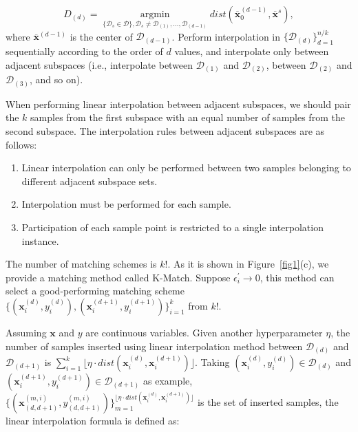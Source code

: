 \documentclass[sn-mathphys,Numbered]{sn-jnl}%
\theoremstyle{thmstyleone}%
\theoremstyle{thmstyletwo}%
\theoremstyle{thmstylethree}%
\begin{document}
\begin{equation}
D_{(d)}=\mathop{argmin}\limits_{\{\mathcal{D}_s\in\mathcal{D}\},\mathcal{D}_s\neq\mathcal{D}_{(1)},\ldots,\mathcal{D}_{(d-1)}}dist(\overline{\boldsymbol{x}}_0^{(d-1)},\overline{\boldsymbol{x}}^s),\label{eq6}
\end{equation}
where $\overline{\boldsymbol{x}}^{(d-1)}$ is the center of $\mathcal{D}_{(d-1)}$. Perform interpolation in $\{\mathcal{D}_{(d)}\}_{d=1}^{n/k}$ sequentially according to the order of $d$ values, and interpolate only between adjacent subspaces (i.e., interpolate between $\mathcal{D}_{(1)}$ and $\mathcal{D}_{(2)}$, between $\mathcal{D}_{(2)}$ and $\mathcal{D}_{(3)}$, and so on). 

When performing linear interpolation between adjacent subspaces, we should pair the $k$ samples from the first subspace with an equal number of samples from the second subspace. The interpolation rules between adjacent subspaces are as follows:

\begin{enumerate}[2.]

\item Linear interpolation can only be performed between two samples belonging to different adjacent subspace sets.

\item Interpolation must be performed for each sample.

\item Participation of each sample point is restricted to a single interpolation instance. 

\end{enumerate}

The number of matching schemes is $k!$. As it is shown in Figure~\ref{fig1}(c), we provide a matching method called K-Match. Suppose $\epsilon_i^\prime\rightarrow0$, this method can select a good-performing matching scheme $\{(\boldsymbol{x}_i^{(d)},y_i^{(d)}),(\boldsymbol{x}_i^{(d+1)},y_i^{(d+1)})\}_{i=1}^k$ from $k!$.

Assuming $\boldsymbol{x}$ and $y$ are continuous variables. Given another hyperparameter $\eta$, the number of samples inserted using linear interpolation method between $\mathcal{D}_{(d)}$ and $\mathcal{D}_{(d+1)}$ is $\sum\limits_{i=1}^k\lfloor\eta\cdot dist(\boldsymbol{x}_i^{(d)},\boldsymbol{x}_i^{(d+1)})\rfloor$. Taking $(\boldsymbol{x}_i^{(d)},y_i^{(d)})\in\mathcal{D}_{(d)}$ and $(\boldsymbol{x}_i^{(d+1)},y_i^{(d+1)})\in\mathcal{D}_{(d+1)}$ as example, $\{(\boldsymbol{x}_{(d,d+1)}^{(m,i)},y_{(d,d+1)}^{(m,i)})\}_{m=1}^{\lfloor\eta\cdot dist(\boldsymbol{x}_i^{(d)},\boldsymbol{x}_i^{(d+1)})\rfloor}$ is the set of inserted samples, the linear interpolation formula is defined as:
\end{document}
